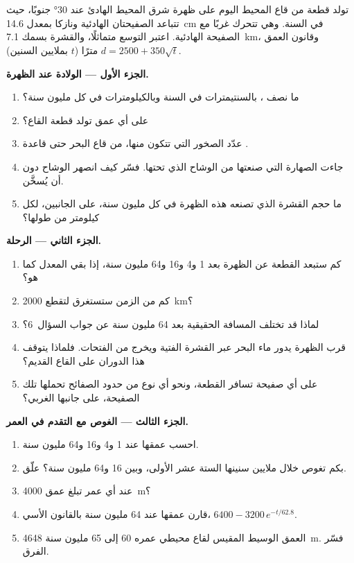 \begin{problem}
\label{pb:g11:ocean-ridges:1}
تولد قطعة من قاع المحيط اليوم على ظهرة شرق المحيط الهادئ عند \ang{30}
جنوبًا، حيث تتباعد الصفيحتان الهادئية ونازكا بمعدل \qty{14.6}{cm} في السنة.
وهي تتحرك غربًا مع الصفيحة الهادئية. اعتبر التوسع متماثلًا،
والقشرة بسمك \qty{7.1}{km}، وقانون العمق $d = 2500 + 350\sqrt{t}$ مترًا
($t$ بملايين السنين).

\medskip
\noindent\textbf{الجزء الأول --- الولادة عند الظهرة.}
\begin{enumerate}
  \item ما نصف ، بالسنتيمترات في السنة وبالكيلومترات في كل
        مليون سنة؟
  \item على أي عمق تولد قطعة القاع؟
  \item عدّد الصخور التي تتكون منها، من قاع البحر حتى قاعدة
        .
  \item جاءت الصهارة التي صنعتها من الوشاح الذي تحتها. فسّر كيف
        انصهر الوشاح دون أن يُسخَّن.
  \item ما حجم القشرة الذي تصنعه هذه الظهرة في كل مليون سنة، على
        الجانبين، لكل كيلومتر من طولها؟
\end{enumerate}

\medskip
\noindent\textbf{الجزء الثاني --- الرحلة.}
\begin{enumerate}[resume]
  \item كم ستبعد القطعة عن الظهرة بعد 1 و4 و16 و64
        مليون سنة، إذا بقي المعدل كما هو؟
  \item كم من الزمن ستستغرق لتقطع \qty{2000}{km}؟
  \item لماذا قد تختلف المسافة الحقيقية بعد 64 مليون سنة عن
        جواب السؤال~6؟
  \item قرب الظهرة يدور ماء البحر عبر القشرة الفتية ويخرج
        من الفتحات. فلماذا يتوقف هذا الدوران على القاع القديم؟
  \item على أي صفيحة تسافر القطعة، ونحو أي نوع من حدود
        الصفائح تحملها تلك الصفيحة، على جانبها الغربي؟
\end{enumerate}

\medskip
\noindent\textbf{الجزء الثالث --- الغوص مع التقدم في العمر.}
\begin{enumerate}[resume]
  \item احسب عمقها عند 1 و4 و16 و64 مليون سنة.
  \item بكم تغوص خلال ملايين سنينها الستة عشر الأولى،
        وبين 16 و64 مليون سنة؟ علّق.
  \item عند أي عمر تبلغ عمق \qty{4000}{m}؟
  \item قارن عمقها عند 64 مليون سنة بالقانون الأسي،
        $6400 - 3200\,e^{-t/62.8}$.
  \item العمق الوسيط المقيس لقاع محيطي عمره 60 إلى 65 مليون سنة
        \qty{4648}{m}. فسّر الفرق.
\end{enumerate}


\end{problem}
